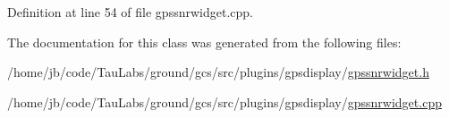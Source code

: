 \-Definition at line 54 of file gpssnrwidget.\-cpp.



\-The documentation for this class was generated from the following files\-:\begin{DoxyCompactItemize}
\item 
/home/jb/code/\-Tau\-Labs/ground/gcs/src/plugins/gpsdisplay/\hyperlink{gpssnrwidget_8h}{gpssnrwidget.\-h}\item 
/home/jb/code/\-Tau\-Labs/ground/gcs/src/plugins/gpsdisplay/\hyperlink{gpssnrwidget_8cpp}{gpssnrwidget.\-cpp}\end{DoxyCompactItemize}
